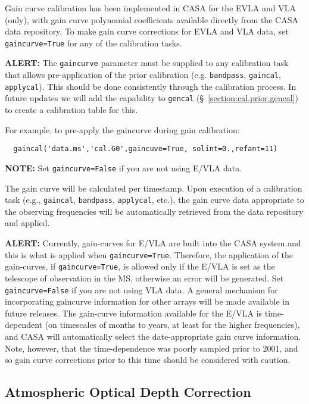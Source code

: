 Gain curve calibration has been implemented in CASA for the EVLA and
VLA (only), with gain curve polynomial coefficients available directly
from the CASA data repository.  To make gain curve corrections for
EVLA and VLA data, set {\tt gaincurve=True} for any of the calibration
tasks.

{\bf ALERT:} The {\tt gaincurve} parameter must be supplied
to any calibration task that allows pre-application of the prior
calibration (e.g. {\tt bandpass}, {\tt gaincal}, {\tt applycal}).
This should be done consistently through the calibration process.
In future updates we will add the capability to {\tt gencal}
(\S~\ref{section:cal.prior.gencal}) to create a calibration table for this.

For example, to pre-apply the gaincurve during gain calibration:
\small
\begin{verbatim}
  gaincal('data.ms','cal.G0',gaincuve=True, solint=0.,refant=11)
\end{verbatim}
\normalsize
{\bf NOTE:} Set {\tt gaincurve=False} if you are not using E/VLA data.

The gain curve will be calculated per timestamp.  Upon execution of a
calibration task (e.g., {\tt gaincal}, {\tt bandpass}, {\tt applycal}, 
etc.), the gain
curve data appropriate to the observing frequencies will be
automatically retrieved from the data repository and applied.

{\bf ALERT:} Currently, gain-curves for E/VLA are built into
the CASA system and this is what is applied when {\tt gaincurve=True}.
Therefore, the application of the gain-curves, if {\tt gaincurve=True},
is allowed only if the E/VLA is set as the telescope of observation
in the MS, otherwise an error will be generated.
Set {\tt gaincurve=False} if you are not using VLA data.  
A general mechanism for incorporating gaincurve information for
other arrays will be made available in future releases.
The gain-curve information available for the E/VLA is
time-dependent (on timescales of months to years, at least for the 
higher frequencies), and CASA will automatically select 
the date-appropriate gain curve information.  Note, however, that 
the time-dependence was poorly sampled prior to 2001, and so gain 
curve corrections prior to this time should be considered with caution.  


\subsection{Atmospheric Optical Depth Correction}
\label{section:cal.prior.opacity}

